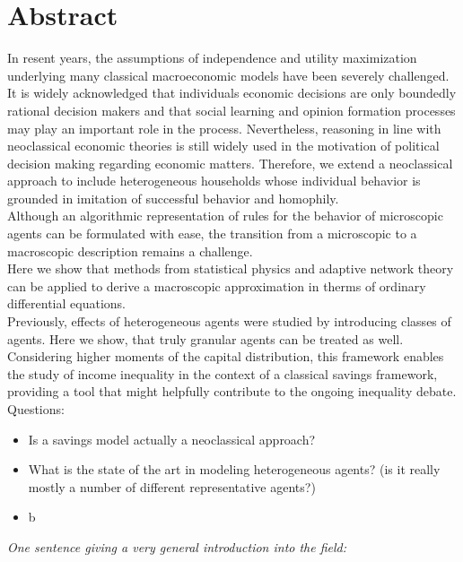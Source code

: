\section{Abstract}


In resent years, the assumptions of independence and utility maximization underlying many classical macroeconomic models have been severely challenged.  \\
It is widely acknowledged that individuals economic decisions are only boundedly rational decision makers and that social learning and opinion formation processes may play an important role in the process. Nevertheless, reasoning in line with neoclassical economic theories is still widely used in the motivation of political decision making regarding economic matters. Therefore, we extend a neoclassical approach to include heterogeneous households whose individual behavior is grounded in imitation of successful behavior and homophily. \\
Although an algorithmic representation of rules for the behavior of microscopic agents can be formulated with ease, the transition from a microscopic to a macroscopic description remains a challenge. \\
Here we show that methods from statistical physics and adaptive network theory can be applied to derive a macroscopic approximation in therms of ordinary differential equations. \\
Previously, effects of heterogeneous agents were studied by introducing classes of agents. Here we show, that truly granular agents can be treated as well.\\
Considering higher moments of the capital distribution, this framework enables the study of income inequality in the context of a classical savings framework, providing a tool that might helpfully contribute to the ongoing inequality debate. \\

Questions:
\begin{itemize}
	\item Is a savings model actually a neoclassical approach?
	\item What is the state of the art in modeling heterogeneous agents? (is it really mostly a number of different representative agents?)
	\item b
\end{itemize}

\emph{One sentence giving a very general introduction into the field:} \\

